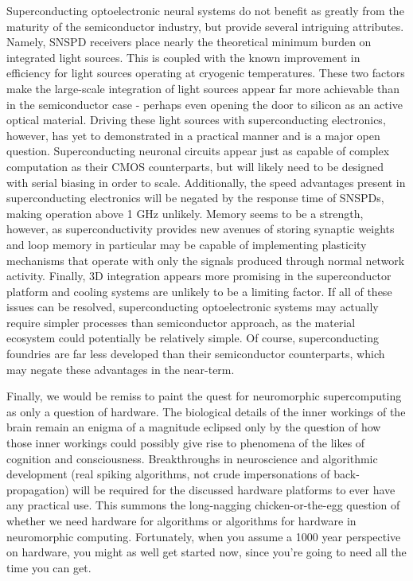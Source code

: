 \documentclass[twocolumn]{article}
\begin{document}
Superconducting optoelectronic neural systems do not benefit as greatly from the maturity of the semiconductor industry, but provide several intriguing attributes. Namely, SNSPD receivers place nearly the theoretical minimum burden on integrated light sources. This is coupled with the known improvement in efficiency for light sources operating at cryogenic temperatures. These two factors make the large-scale integration of light sources appear far more achievable than in the semiconductor case - perhaps even opening the door to silicon as an active optical material. Driving these light sources with superconducting electronics, however, has yet to demonstrated in a practical manner and is a major open question. Superconducting neuronal circuits appear just as capable of complex computation as their CMOS counterparts, but will likely need to be designed with serial biasing in order to scale. Additionally, the speed advantages present in superconducting electronics will be negated by the response time of SNSPDs, making operation above 1 GHz unlikely. Memory seems to be a strength, however, as superconductivity provides new avenues of storing synaptic weights and loop memory in particular may be capable of implementing plasticity mechanisms that operate with only the signals produced through normal network activity. Finally, 3D integration appears more promising in the superconductor platform and cooling systems are unlikely to be a limiting factor. If all of these issues can be resolved, superconducting optoelectronic systems may actually require simpler processes than semiconductor approach, as the material ecosystem could potentially be relatively simple. Of course, superconducting foundries are far less developed than their semiconductor counterparts, which may negate these advantages in the near-term.

Finally, we would be remiss to paint the quest for neuromorphic supercomputing as only a question of hardware. The biological details of the inner workings of the brain remain an enigma of a magnitude eclipsed only by the question of how those inner workings could possibly give rise to phenomena of the likes of cognition and consciousness. Breakthroughs in neuroscience and algorithmic development (real spiking algorithms, not crude impersonations of back-propagation) will be required for the discussed hardware platforms to ever have any practical use. This summons the long-nagging chicken-or-the-egg question of whether we need hardware for algorithms or algorithms for hardware in neuromorphic computing. Fortunately, when you assume a 1000 year perspective on hardware, you might as well get started now, since you're going to need all the time you can get.




\end{document}
